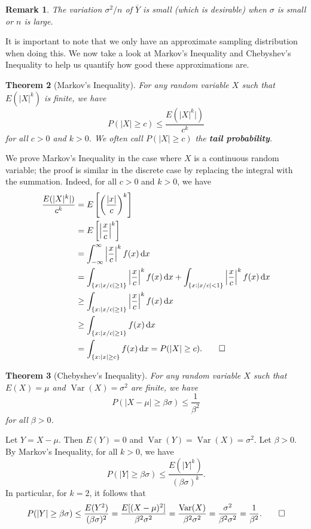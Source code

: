 \documentclass[10pt]{article}
\makeatletter
\newcommand{\dd}{\,{\rm d}}
\DeclareMathOperator{\Var}{Var}
\theoremstyle{newstyle}
\newtheorem{thm}{Theorem}[section]
\newtheorem{remark}[thm]{Remark}
\newenvironment{pf}[1][\proofname]{\par
  \pushQED{\qed}%
  \normalfont \topsep0\p@\relax
  \trivlist
  \item[\hskip\labelsep\scshape
  #1\@addpunct{.}]\ignorespaces
}{%
  \popQED\endtrivlist\@endpefalse
}
\makeatother
\begin{document}
\begin{remark}
The variation $\sigma^2/n$ of $\overline Y$ is small (which is desirable) when $\sigma$ is small 
or $n$ is large. 
\end{remark}

It is important to note that we only have an approximate sampling distribution when doing this.
We now take a look at Markov's Inequality and Chebyshev's Inequality to help us quantify how good these 
approximations are. 

\begin{thm}[Markov's Inequality]
For any random variable $X$ such that $E(|X|^k)$ is finite, we have 
\[ P( |X| \geq c ) \leq \frac{E (|X|^k|)}{c^k} \]
for all $c > 0$ and $k > 0$. We often call $P(|X| \geq c)$ the {\bf tail probability}.
\end{thm}
\begin{pf}
We prove Markov's Inequality in the case where $X$ is a continuous random variable; the 
proof is similar in the discrete case by replacing the integral with the summation. 
Indeed, for all $c > 0$ and $k > 0$, we have 
\begin{align*}
    \frac{E (|X|^k|)}{c^k} 
    &= E \left[ \left( \frac{|x|}c \right)^k \right] \\
    &= E \left [ \left| \frac xc \right|^k \right] \\
    &= \int_{-\infty}^\infty \left| \frac xc \right|^k f(x)\dd x \\
    &= \int_{\{x : |x/c| \geq 1\}} \left| \frac xc \right|^k f(x) \dd x 
    + \int_{\{x : |x/c| < 1\}} \left| \frac xc \right|^k f(x) \dd x \\
    &\geq \int_{\{x : |x/c| \geq 1\}} \left| \frac xc \right|^k f(x) \dd x \\
    &\geq \int_{\{x : |x/c| \geq 1\}} f(x) \dd x \\
    &= \int_{\{x : |x| \geq c\}} f(x) \dd x 
    = P(|X| \geq c). \qedhere 
\end{align*}
\end{pf}

\begin{thm}[Chebyshev's Inequality]
For any random variable $X$ such that $E(X) = \mu$ and $\Var(X) = \sigma^2$ are finite, we have 
\[ P(|X - \mu| \geq \beta\sigma) \leq \frac1{\beta^2} \]
for all $\beta > 0$.
\end{thm}
\begin{pf}
Let $Y = X - \mu$. Then $E(Y) = 0$ and $\Var(Y) = \Var(X) = \sigma^2$. Let $\beta > 0$. 
By Markov's Inequality, for all $k > 0$, we have 
\[ P(|Y| \geq \beta\sigma) \leq \frac{E(|Y|^k)}{(\beta\sigma)^k}. \]
In particular, for $k = 2$, it follows that 
\[ P(|Y| \geq \beta\sigma) \leq \frac{E(Y^2)}{(\beta\sigma)^2} 
= \frac{E[(X-\mu)^2]}{\beta^2\sigma^2} = \frac{\Var(X)}{\beta^2\sigma^2} = 
\frac{\sigma^2}{\beta^2\sigma^2} = \frac{1}{\beta^2}. \qedhere \]
\end{pf}
\end{document}
